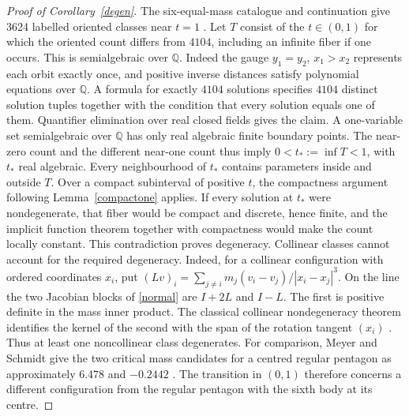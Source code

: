 \documentclass[11pt]{article}
\begin{document}
\begin{proof}[Proof of Corollary~\ref{degen}]
The six-equal-mass catalogue and continuation give 3624 labelled oriented classes near $t=1$ \cite[Table 3]{near}. Let $T$ consist of the $t\in(0,1)$ for which the oriented count differs from $4104$, including an infinite fiber if one occurs. This is semialgebraic over $\mathbb Q$. Indeed the gauge $y_1=y_2$, $x_1>x_2$ represents each orbit exactly once, and positive inverse distances satisfy polynomial equations over $\mathbb Q$. A formula for exactly $4104$ solutions specifies $4104$ distinct solution tuples together with the condition that every solution equals one of them. Quantifier elimination over real closed fields gives the claim. A one-variable set semialgebraic over $\mathbb Q$ has only real algebraic finite boundary points. The near-zero count and the different near-one count thus imply $0<t_*:=\inf T<1$, with $t_*$ real algebraic. Every neighbourhood of $t_*$ contains parameters inside and outside $T$. Over a compact subinterval of positive $t$, the compactness argument following Lemma~\ref{compactone} applies. If every solution at $t_*$ were nondegenerate, that fiber would be compact and discrete, hence finite, and the implicit function theorem together with compactness would make the count locally constant. This contradiction proves degeneracy. Collinear classes cannot account for the required degeneracy. Indeed, for a collinear configuration with ordered coordinates $x_i$, put $(Lv)_i=\sum_{j\ne i}m_j(v_i-v_j)/|x_i-x_j|^3$. On the line the two Jacobian blocks of \eqref{normal} are $I+2L$ and $I-L$. The first is positive definite in the mass inner product. The classical collinear nondegeneracy theorem identifies the kernel of the second with the span of the rotation tangent $(x_i)$ \cite{collinear}. Thus at least one noncollinear class degenerates. For comparison, Meyer and Schmidt give the two critical mass candidates for a centred regular pentagon as approximately $6.478$ and $-0.2442$ \cite[Appendices A--B, $n=5$]{polygon}. The transition in $(0,1)$ therefore concerns a different configuration from the regular pentagon with the sixth body at its centre.
\end{proof}
\end{document}
